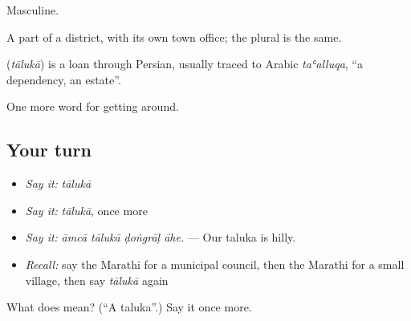 Masculine.

A part of a district, with its own town office; the plural is the same.

\begin{cousinweb}
\textbf{} (\emph{tālukā}) is a loan through Persian, usually traced to Arabic \emph{taʿalluqa}, \textquotedblleft{}a dependency, an estate\textquotedblright{}.
\end{cousinweb}

\begin{grammarlens}[title={What you've built}]
One more word for getting around.
\end{grammarlens}

\subsection*{Your turn}
\begin{itemize}
\raggedright
  \item \emph{Say it:} \emph{tālukā}
  \item \emph{Say it:} \emph{tālukā}, once more
  \item \emph{Say it:} \emph{āmcā tālukā ḍoṅgrāḷ āhe.} — Our taluka is hilly.
  \item \emph{Recall:} say the Marathi for a municipal council, then the Marathi for a small village, then say \emph{tālukā} again
\end{itemize}

\begin{tcolorbox}[breakable,colback=teal!4,colframe=teal!35!black,title={Before you move on}]
What does  mean? (\textquotedblleft{}A taluka\textquotedblright{}.) Say it once more.
\end{tcolorbox}
